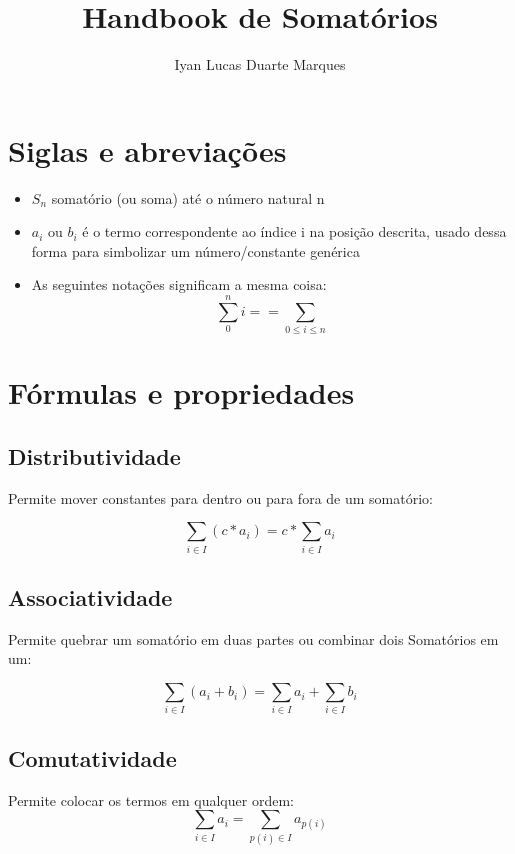 \documentclass[12pt]{article}
\title{Handbook de Somatórios}
\author{Iyan Lucas Duarte Marques}
\begin{document}
\maketitle
\section{Siglas e abreviações}
\begin{itemize}
\item $S_n$ somatório (ou soma) até o número natural n
\item $a_i$ ou $b_i$ é o termo correspondente ao índice i na posição descrita, usado dessa forma 
para simbolizar um número/constante genérica
\item As seguintes notações significam a mesma coisa:
    \begingroup
    \LARGE
    \begin{equation}
        \sum_{0}^{n}i == \sum_{0\leq i\leq n}
    \end{equation}
    \endgroup

\end{itemize}


\section{Fórmulas e propriedades}
\subsection{Distributividade}
Permite mover constantes para dentro ou para fora de um somatório:

\begingroup
\LARGE
\begin{equation}
\sum_{i\in I}(c*a_i) = c*\sum_{i\in I}a_i
\end{equation}
\endgroup
\subsection{Associatividade}
Permite quebrar um somatório em duas partes ou combinar dois Somatórios em um:

\begingroup
\LARGE
\begin{equation}
\sum_{i\in I}(a_i+b_i) = \sum_{i\in I}a_i + \sum_{i\in I}b_i
\end{equation}
\endgroup

\subsection{Comutatividade}
Permite colocar os termos em qualquer ordem:
\begingroup
\LARGE
\begin{equation}
\sum_{i\in I}a_i = \sum_{p(i)\in I}a_{p(i)}
\end{equation}
\endgroup
\end{document}
